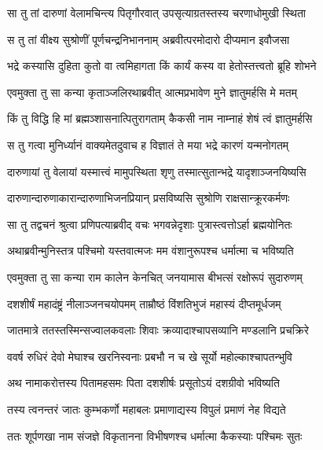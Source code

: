 \twolineshloka
{सा तु तां दारुणां वेलामचिन्त्य पितृगौरवात्}
{उपसृत्याग्रतस्तस्य चरणाधोमुखी स्थिता} %

\twolineshloka
{स तु तां वीक्ष्य सुश्रोणीं पूर्णचन्द्रनिभाननाम्}
{अब्रवीत्परमोदारो दीप्यमान इवौजसा} %

\twolineshloka
{भद्रे कस्यासि दुहिता कुतो वा त्वमिहागता}
{किं कार्यं कस्य वा हेतोस्तत्त्वतो ब्रूहि शोभने} %

\twolineshloka
{एवमुक्ता तु सा कन्या कृताञ्जलिरथाब्रवीत्}
{आत्मप्रभावेण मुने ज्ञातुमर्हसि मे मतम्} %

\twolineshloka
{किं तु विद्धि हि मां ब्रह्मञ्शासनात्पितुरागताम्}
{कैकसी नाम नाम्नाहं शेषं त्वं ज्ञातुमर्हसि} %

\twolineshloka
{स तु गत्वा मुनिर्ध्यानं वाक्यमेतदुवाच ह}
{विज्ञातं ते मया भद्रे कारणं यन्मनोगतम्} %

\twolineshloka
{दारुणायां तु वेलायां यस्मात्त्वं मामुपस्थिता}
{शृणु तस्मात्सुतान्भद्रे यादृशाञ्जनयिष्यसि} %

\twolineshloka
{दारुणान्दारुणाकारान्दारुणाभिजनप्रियान्}
{प्रसविष्यसि सुश्रोणि राक्षसान्क्रूरकर्मणः} %

\twolineshloka
{सा तु तद्वचनं श्रुत्वा प्रणिपत्याब्रवीद् वचः}
{भगवन्नेदृशाः पुत्रास्त्वत्तोऽर्हा ब्रह्मयोनितः} %

\twolineshloka
{अथाब्रवीन्मुनिस्तत्र पश्चिमो यस्तवात्मजः}
{मम वंशानुरूपश्च धर्मात्मा च भविष्यति} %

\twolineshloka
{एवमुक्ता तु सा कन्या राम कालेन केनचित्}
{जनयामास बीभत्सं रक्षोरूपं सुदारुणम्} %

\twolineshloka
{दशशीर्षं महादंष्ट्रं नीलाञ्जनचयोपमम्}
{ताम्रौष्ठं विंशतिभुजं महास्यं दीप्तमूर्धजम्} %

\twolineshloka
{जातमात्रे ततस्तस्मिन्सज्वालकवलाः शिवाः}
{क्रव्यादाश्चापसव्यानि मण्डलानि प्रचक्रिरे} %

\twolineshloka
{ववर्ष रुधिरं देवो मेघाश्च खरनिस्वनाः}
{प्रबभौ न च खे सूर्यो महोल्काश्चापतन्भुवि} %

\twolineshloka
{अथ नामाकरोत्तस्य पितामहसमः पिता}
{दशशीर्षः प्रसूतोऽयं दशग्रीवो भविष्यति} %

\twolineshloka
{तस्य त्वनन्तरं जातः कुम्भकर्णो महाबलः}
{प्रमाणाद्यस्य विपुलं प्रमाणं नेह विद्यते} %

\twolineshloka
{ततः शूर्पणखा नाम संजज्ञे विकृतानना}
{विभीषणश्च धर्मात्मा कैकस्याः पश्चिमः सुतः} %

